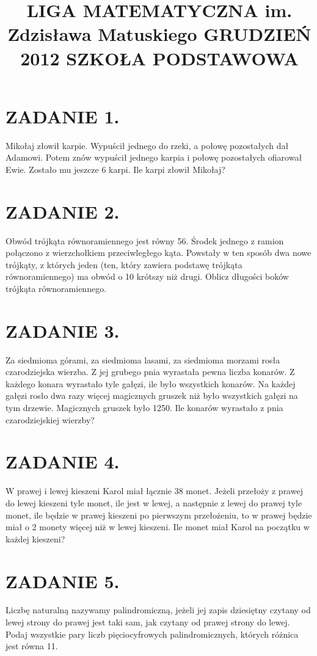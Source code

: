 \documentclass[10pt]{article}
\title{LIGA MATEMATYCZNA im. Zdzisława Matuskiego GRUDZIEŃ 2012 SZKOŁA PODSTAWOWA }
\author{}
\date{}
\begin{document}
\maketitle
\section*{ZADANIE 1.}
Mikołaj złowił karpie. Wypuścił jednego do rzeki, a połowę pozostałych dał Adamowi. Potem znów wypuścił jednego karpia i połowę pozostałych ofiarował Ewie. Zostało mu jeszcze 6 karpi. Ile karpi złowił Mikołaj?

\section*{ZADANIE 2.}
Obwód trójkąta równoramiennego jest równy 56. Środek jednego z ramion połączono z wierzchołkiem przeciwległego kąta. Powstały w ten sposób dwa nowe trójkąty, z których jeden (ten, który zawiera podstawę trójkąta równoramiennego) ma obwód o 10 krótszy niż drugi. Oblicz długości boków trójkąta równoramiennego.

\section*{ZADANIE 3.}
Za siedmioma górami, za siedmioma lasami, za siedmioma morzami rosła czarodziejska wierzba. Z jej grubego pnia wyrastała pewna liczba konarów. Z każdego konara wyrastało tyle gałęzi, ile było wszystkich konarów. Na każdej gałęzi rosło dwa razy więcej magicznych gruszek niż było wszystkich gałęzi na tym drzewie. Magicznych gruszek było 1250. Ile konarów wyrastało z pnia czarodziejskiej wierzby?

\section*{ZADANIE 4.}
W prawej i lewej kieszeni Karol miał łącznie 38 monet. Jeżeli przełoży z prawej do lewej kieszeni tyle monet, ile jest w lewej, a następnie z lewej do prawej tyle monet, ile będzie w prawej kieszeni po pierwszym przełożeniu, to w prawej będzie miał o 2 monety więcej niż w lewej kieszeni. Ile monet miał Karol na początku w każdej kieszeni?

\section*{ZADANIE 5.}
Liczbę naturalną nazywamy palindromiczną, jeżeli jej zapis dziesiętny czytany od lewej strony do prawej jest taki sam, jak czytany od prawej strony do lewej. Podaj wszystkie pary liczb pięciocyfrowych palindromicznych, których różnica jest równa 11.
\end{document}

